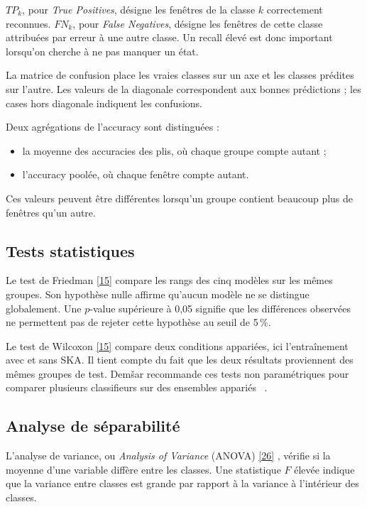 \documentclass[12pt,a4paper]{article}
\newcommand{\openaccessref}[2]{%
  \nobreak\hspace{0.08em}%
  \href{#2}{\textcolor{green!35!black}{[#1]}}%
}
\begin{document}
$TP_k$, pour \emph{True Positives}, désigne les fenêtres de la classe $k$
correctement reconnues. $FN_k$, pour \emph{False Negatives}, désigne les
fenêtres de cette classe attribuées par erreur à une autre classe. Un recall
élevé est donc important lorsqu'on cherche à ne pas manquer un état.

La matrice de confusion place les vraies classes sur un axe et les classes
prédites sur l'autre. Les valeurs de la diagonale correspondent aux bonnes
prédictions ; les cases hors diagonale indiquent les confusions.

Deux agrégations de l'accuracy sont distinguées :

\begin{itemize}[leftmargin=1.5em]
  \item la moyenne des accuracies des plis, où chaque groupe compte autant ;
  \item l'accuracy poolée, où chaque fenêtre compte autant.
\end{itemize}

Ces valeurs peuvent être différentes lorsqu'un groupe contient beaucoup plus
de fenêtres qu'un autre.

\subsection{Tests statistiques}

Le test de Friedman\openaccessref{15}{https://www.jmlr.org/papers/volume7/demsar06a/demsar06a.pdf} compare les rangs des cinq modèles sur les mêmes groupes.
Son hypothèse nulle affirme qu'aucun modèle ne se distingue globalement. Une
$p$-value supérieure à 0,05 signifie que les différences observées ne
permettent pas de rejeter cette hypothèse au seuil de 5\,\%.

Le test de Wilcoxon\openaccessref{15}{https://www.jmlr.org/papers/volume7/demsar06a/demsar06a.pdf} compare deux conditions appariées, ici l'entraînement avec
et sans SKA. Il tient compte du fait que les deux résultats proviennent des
mêmes groupes de test. Demšar recommande ces tests non paramétriques pour
comparer plusieurs classifieurs sur des ensembles appariés
~\cite{demsar2006}.

\subsection{Analyse de séparabilité}

L'analyse de variance, ou \emph{Analysis of Variance} (ANOVA)\openaccessref{26}{https://www.itl.nist.gov/div898/handbook/prc/section4/prc431.htm}, vérifie si la
moyenne d'une variable diffère entre les classes. Une statistique $F$ élevée
indique que la variance entre classes est grande par rapport à la variance à
l'intérieur des classes.
\end{document}
